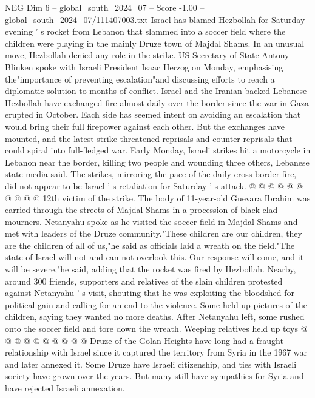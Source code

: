 \begin{textsample}{NEG Dim 6 – global\_south\_2024\_07 – Score -1.00 – global\_south\_2024\_07/111407003.txt}  \label{ex:f6_neg_134}
Israel has blamed Hezbollah for Saturday evening ' s rocket from Lebanon that slammed into a soccer field where the children were playing in the mainly Druze town of Majdal Shams.
In an unusual move, Hezbollah denied any role in the strike.
US Secretary of State Antony Blinken spoke with Israeli President Isaac Herzog on Monday, emphasising the"importance of preventing escalation"and discussing efforts to reach a diplomatic solution to months of conflict.
Israel and the Iranian-backed Lebanese Hezbollah have exchanged fire almost daily over the border since the war in Gaza erupted in October.
Each side has seemed intent on avoiding an escalation that would bring their full firepower against each other.
But the exchanges have mounted, and the latest strike threatened reprisals and counter-reprisals that could spiral into full-fledged war.
Early Monday, Israeli strikes hit a motorcycle in Lebanon near the border, killing two people and wounding three others, Lebanese state media said.
The strikes, mirroring the pace of the daily cross-border fire, did not appear to be Israel ' s retaliation for Saturday ' s attack. @ @ @ @ @ @ @ @ @ @ 12th victim of the strike.
The body of 11-year-old Guevara Ibrahim was carried through the streets of Majdal Shams in a procession of black-clad mourners.
Netanyahu spoke as he visited the soccer field in Majdal Shams and met with leaders of the Druze community."These children are our children, they are the children of all of us,"he said as officials laid a wreath on the field."The state of Israel will not and can not overlook this.
Our response will come, and it will be severe,"he said, adding that the rocket was fired by Hezbollah.
Nearby, around 300 friends, supporters and relatives of the slain children protested against Netanyahu ' s visit, shouting that he was exploiting the bloodshed for political gain and calling for an end to the violence.
Some held up pictures of the children, saying they wanted no more deaths.
After Netanyahu left, some rushed onto the soccer field and tore down the wreath.
Weeping relatives held up toys @ @ @ @ @ @ @ @ @ @ Druze of the Golan Heights have long had a fraught relationship with Israel since it captured the territory from Syria in the 1967 war and later annexed it.
Some Druze have Israeli citizenship, and ties with Israeli society have grown over the years.
But many still have sympathies for Syria and have rejected Israeli annexation.

\end{textsample}

